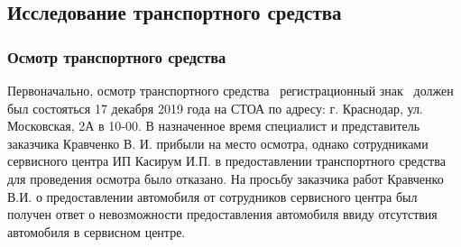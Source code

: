 \subsection{Исследование транспортного средства}
%

\subsubsection{Осмотр транспортного средства }

Первоначально, осмотр транспортного средства \, регистрационный знак \, должен был состояться 17 декабря 2019 года на СТОА по адресу: г. Краснодар, ул. Московская, 2А в 10-00.  В назначенное время специалист и представитель заказчика Кравченко В. И. прибыли на место осмотра, однако сотрудниками сервисного центра ИП Касирум И.П. в предоставлении транспортного средства для проведения осмотра было отказано. На просьбу заказчика работ Кравченко В.И. о предоставлении автомобиля  от сотрудников сервисного центра был получен ответ о невозможности предоставления автомобиля ввиду отсутствия автомобиля в сервисном центре.

